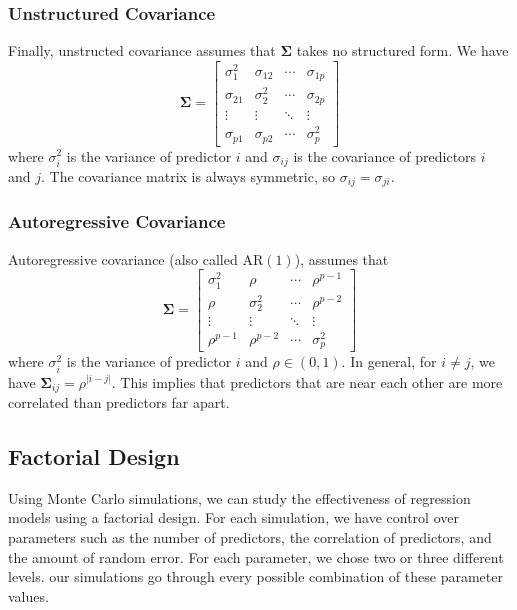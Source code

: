 \documentclass{article}
\begin{document}
\subsubsection{Unstructured Covariance}
Finally, unstructed covariance assumes that $\mathbf{\Sigma}$ takes no structured form. We have
\begin{equation}
	\mathbf{\Sigma} = \begin{bmatrix}
		\sigma_1^2 & \sigma_{12} & \cdots & \sigma_{1p}\\
		\sigma_{21} & \sigma_2^2 & \cdots & \sigma_{2p}\\
		\vdots & \vdots & \ddots & \vdots \\
		\sigma_{p1} & \sigma_{p2} & \cdots & \sigma_p^2
	\end{bmatrix}	
\end{equation}
where $\sigma_i^2$ is the variance of predictor $i$ and $\sigma_{ij}$ is the covariance of predictors $i$ and $j$. The covariance matrix is always symmetric, so $\sigma_{ij} = \sigma_{ji}$.

\subsubsection{Autoregressive Covariance}
Autoregressive covariance (also called $\text{AR}(1)$), assumes that
\begin{equation}
	\mathbf{\Sigma} = \begin{bmatrix}
		\sigma_1^2 & \rho & \cdots & \rho^{p - 1}\\
		\rho & \sigma_2^2 & \cdots & \rho^{p - 2}\\
		\vdots & \vdots & \ddots & \vdots\\
		\rho^{p - 1} & \rho^{p - 2} & \cdots & \sigma_p^2
	\end{bmatrix}
\end{equation}
where $\sigma_i^2$ is the variance of predictor $i$ and $\rho \in (0, 1)$. In general, for $i\neq j$, we have $\mathbf{\Sigma}_{ij} = \rho^{\vert i - j\vert}$. This implies that predictors that are near each other are more correlated than predictors far apart.

\subsection{Factorial Design}
Using Monte Carlo simulations, we can study the effectiveness of regression models using a factorial design. For each simulation, we have control over parameters such as the number of predictors, the correlation of predictors, and the amount of random error. For each parameter, we chose two or three different levels. our simulations  go through every possible combination of these parameter values.
\end{document}
